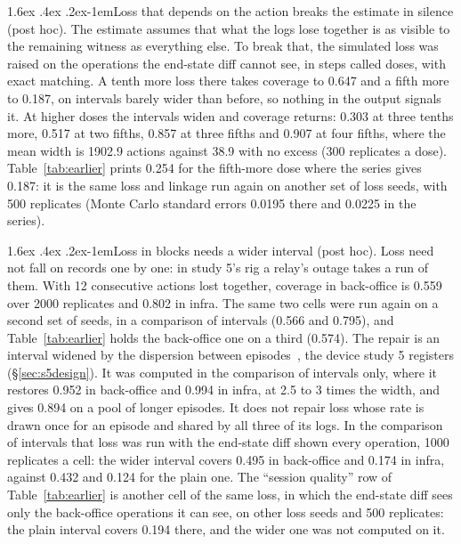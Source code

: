 \documentclass[11pt]{article}
\makeatletter
\renewcommand\paragraph{\@startsection{paragraph}{4}{\z@}%
  {1.6ex \@plus .4ex \@minus .2ex}{-1em}{\normalfont\normalsize\bfseries}}
\makeatother
\begin{document}
\paragraph{Loss that depends on the action breaks the estimate in silence (post hoc).}
The estimate assumes that what
the logs lose together is as visible to the remaining witness as everything else. To
break that, the simulated loss was raised on the operations the end-state diff cannot
see, in steps called doses, with exact matching. A tenth more loss there takes coverage
to 0.647 and a fifth more to 0.187, on intervals barely wider than before, so nothing in
the output signals it. At higher doses the intervals widen and coverage returns: 0.303 at
three tenths more, 0.517 at two fifths, 0.857 at three fifths and 0.907 at four fifths,
where the mean width is 1902.9 actions against 38.9 with no excess (300 replicates a
dose). Table~\ref{tab:earlier} prints 0.254 for the fifth-more dose where the series
gives 0.187: it is the same loss and linkage run again on another set of loss seeds,
with 500 replicates (Monte Carlo standard errors 0.0195 there and 0.0225 in the series).

\paragraph{Loss in blocks needs a wider interval (post hoc).} Loss need not fall on
records one by one: in study 5's rig a relay's outage takes a run of them. With 12 consecutive actions lost together, coverage in
back-office is 0.559 over 2000 replicates and 0.802 in infra. The same two cells were
run again on a second set of seeds, in a comparison of intervals (0.566 and 0.795), and
Table~\ref{tab:earlier} holds the back-office one on a third (0.574). The repair is an
interval widened by the dispersion between
episodes~\citep{wedderburn1974quasi,mccullagh1989glm}, the device study 5 registers
(\S\ref{sec:s5design}). It was computed in the comparison of intervals only, where it
restores 0.952 in back-office and 0.994 in infra, at 2.5 to 3 times the width, and
gives 0.894 on a pool of longer episodes. It does not repair loss whose rate is drawn
once for an episode and shared by all three of its logs. In the comparison of intervals
that loss was run with the end-state diff shown every operation, 1000 replicates a
cell: the wider interval covers 0.495 in back-office and 0.174 in infra, against 0.432
and 0.124 for the plain one. The ``session quality'' row of Table~\ref{tab:earlier} is
another cell of the same loss, in which the end-state diff sees only the back-office
operations it can see, on other loss seeds and 500 replicates: the plain interval
covers 0.194 there, and the wider one was not computed on it.
\end{document}
